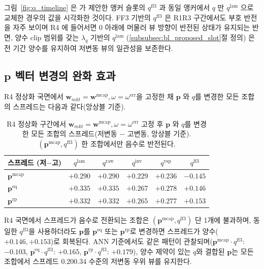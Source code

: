 \documentclass[eng]{kjas3}
\begin{document}
그림~\ref{fig:q_timeline} 은 \citet{pyo2018} 가 제안한 앵커 슬롯의 $q^{\mathrm{ff3}}$ 과 동일 앵커에서 $q$ 만 $q^{\mathrm{lam}}$ 으로 교체한 경우의 값을 시각화한 것이다. FF3 기반의 $q^{\mathrm{ff3}}$ 은 R1\textendash R3 구간에서도 부호 반전을 자주 보이며 R4 에 들어서면 0 아래에 머물러 뷰 방향이 반전된 상태가 유지되는 반면,
양수 clip 범위를 갖는 $\lambda_q$ 기반의 $q^{\mathrm{lam}}$ (\ref{subsubsec:bl_proposed_slot}절 정의) 은 전 기간 양수를 유지하여 저변동 뷰의 일관성을 보존한다.

\subsection{$\mathbf{p}$ 벡터 변경의 완화 효과}

R4 정상화 국면에서 $\mathbf{w}_{mkt} = \mathbf{w}^{\mathrm{mcap}}, \omega = \omega^{\mathrm{err}}$을 고정한 채 $\mathbf{p}$ 와 $q$를 변경한 모든 조합의 스프레드는 다음과 같다(앙상블 기준).

\begin{table}[t]
\centering
\caption{R4 정상화 구간에서 $\mathbf{w}_{mkt} = \mathbf{w}^{\mathrm{mcap}}, \omega = \omega^{\mathrm{err}}$ 고정 후 $\mathbf{p}$ 와 $q$를 변경한 모든 조합의 스프레드(저변동 $-$ 고변동, 앙상블 기준).
$(\mathbf{p}^{\mathrm{mcap}}, q^{\mathrm{ff3}})$ 한 조합에서만 음수로 반전된다.}
\label{tab:r4_pq_spread}
\setlength{\tabcolsep}{10pt}
\renewcommand{\arraystretch}{1.2}
\small
\begin{tabular}{lccccc}
\toprule
스프레드 (저$-$고) & $q^{\mathrm{lam}}$ & $q^{\mathrm{raw}}$ & $q^{\mathrm{inv}}$ & $q^{\mathrm{vsp}}$ & $q^{\mathrm{ff3}}$ \\
\midrule
$\mathbf{p}^{\mathrm{mcap}}$ & $+0.290$ & $+0.290$ & $+0.229$ & $+0.236$ & $\mathbf{-0.145}$ \\
$\mathbf{p}^{\mathrm{eq}}$   & $+0.335$ & $+0.335$ & $+0.267$ & $+0.278$ & $+0.146$ \\
$\mathbf{p}^{\mathrm{rp}}$   & $+0.332$ & $+0.332$ & $+0.265$ & $+0.277$ & $+0.153$ \\
\bottomrule 
\end{tabular}
\end{table}

R4 국면에서 스프레드가 음수로 전환되는 조합은 $(\mathbf{p}^{\mathrm{mcap}}, q^{\mathrm{ff3}})$ 단 1개에 불과하며, 동일한 $q^{\mathrm{ff3}}$을 사용하더라도 $\mathbf{p}$를 $\mathbf{p}^{\mathrm{eq}}$ 또는 $\mathbf{p}^{\mathrm{rp}}$로 변경하면 스프레드가 양수($+0.146, +0.153$)로 회복된다. ANN 기준에서도 같은 패턴이 관찰되며($\mathbf{p}^{\mathrm{mcap}} \cdot q^{\mathrm{ff3}}$: $-0.103$, $\mathbf{p}^{\mathrm{eq}} \cdot q^{\mathrm{ff3}}$: $+0.165$, $\mathbf{p}^{\mathrm{rp}} \cdot q^{\mathrm{ff3}}$: $+0.179$), 양수 제약이 있는 $q$와 결합된 $\mathbf{p}$는 모든 조합에서 스프레드 $0.20$\textendash $0.34$ 수준의 저변동 우위 뷰를 유지한다.
\end{document}
